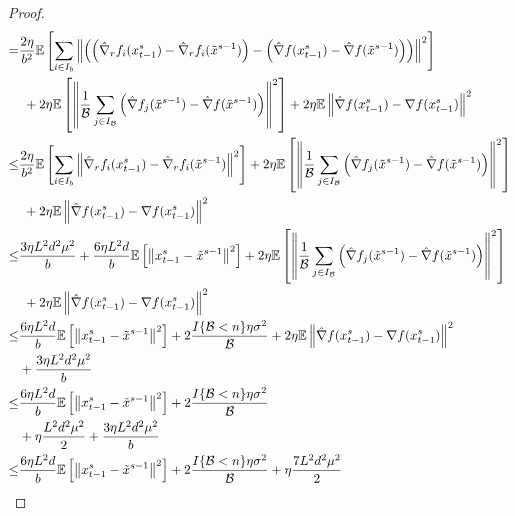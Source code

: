 \documentclass{article}
\newcommand*{\E}{\mathbb{E}}
\newcommand{\norm}[1]{\left\lVert#1\right\rVert}
\theoremstyle{definition}
\theoremstyle{remark}
\begin{document}
\begin{proof}
\begin{align}
   = &\notag\frac{2\eta}{b^2}\E\left[\sum_{i\in I_b}\norm{\left(\left(\hat{\nabla}_r f_i(x_{t-1}^s)-\hat{\nabla}_r f_i(\tilde{x}^{s-1})\right) - \left({\hat{\nabla}} f(x_{t-1}^s) - \hat{\nabla} f(\tilde{x}^{s-1}) \right)\right)}^2\right]\\
   &\,\, \label{RandSGE-var-estimate-lem-3}+ 2\eta \E \left[ \norm{\frac{1}{\mathcal{B}}\sum_{j\in I_\mathcal{B}}\left(\hat{\nabla} f_j(\tilde{x}^{s-1}) - \hat{\nabla} f(\tilde{x}^{s-1})\right)}^2\right]+2\eta \E \norm{\hat{\nabla} f(x_{t-1}^s)-\nabla f(x_{t-1}^s)}^2\\
   \leq  &\frac{2\eta}{b^2}\E\left[\sum_{i\in I_b}\norm{\hat{\nabla}_r f_i(x_{t-1}^s)-\hat{\nabla}_r f_i(\tilde{x}^{s-1})}^2\right]+ 2\eta \E \left[ \norm{\frac{1}{\mathcal{B}}\sum_{j\in I_{\mathcal{B}}}\left(\hat{\nabla} f_j(\tilde{x}^{s-1}) - \hat{\nabla} f(\tilde{x}^{s-1})\right)}^2\right]\notag\\
   &\,\,\label{RandSGE-var-estimate-lem-4}+2\eta \E \norm{\hat{\nabla} f(x_{t-1}^s)-\nabla f(x_{t-1}^s)}^2\\
    \leq  &\frac{3 \eta L^2 d^2 \mu^2}{b} + \frac{6\eta L^2 d}{b}\E\left[\norm{x_{t-1}^s-\tilde{x}^{s-1}}^2\right]+ 2\eta \E \left[ \norm{\frac{1}{\mathcal{B}}\sum_{j\in I_{\mathcal{B}}}\left(\hat{\nabla} f_j(\tilde{x}^{s-1}) - \hat{\nabla} f(\tilde{x}^{s-1})\right)}^2\right]\notag\\
   &\,\,\label{RandSGE-var-estimate-lem-5}+2\eta \E \norm{\hat{\nabla} f(x_{t-1}^s)-\nabla f(x_{t-1}^s)}^2\\
   \leq  &\label{RandSGE-var-estimate-lem-6p}\frac{6\eta L^2d}{b}\E\left[\norm{x_{t-1}^s-\tilde{x}^{s-1}}^2\right]+ 2\frac{I\{\mathcal{B} < n\}\eta \sigma ^2}{\mathcal{B}}+2\eta \E \norm{\hat{\nabla} f(x_{t-1}^s)-\nabla f(x_{t-1}^s)}^2\notag\\
   & + \frac{3 \eta L^2 d^2 \mu^2}{b}\\
   \leq  &\frac{6\eta L^2 d}{b}\E\left[\norm{x_{t-1}^s-\tilde{x}^{s-1}}^2\right]+ 2\frac{I\{\mathcal{B} < n\}\eta \sigma ^2}{\mathcal{B}}\notag\\
   &\label{RandSGE-var-estimate-lem-6} +\eta \frac{L^2d^2\mu^2}{2}+ \frac{3 \eta L^2 d^2 \mu^2}{b}\\
   \leq  &\label{RandSGE-var-estimate-lem-7}\frac{6\eta L^2 d}{b}\E\left[\norm{x_{t-1}^s-\tilde{x}^{s-1}}^2\right]+ 2\frac{I\{\mathcal{B} < n\}\eta \sigma ^2}{\mathcal{B}}+\eta \frac{7L^2 d^2 \mu^2}{2} 
 \end{align}

\end{proof}
\end{document}
